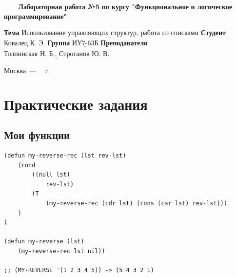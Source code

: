 \documentclass[a4paper,14pt, unknownkeysallowed]{extreport}
\begin{document}
\begin{titlepage}
	
	\begin{center}
		\noindent\begin{minipage}{1.3\textwidth}\centering
		\Large\textbf{   ~~~ Лабораторная работа №5}\newline
		\textbf{по курсу "Функциональное}\newline
		\textbf{и логическое программирование"}\newline\newline\newline
		\end{minipage}
	\end{center}
	
	\noindent\textbf{Тема} 			$\underline{\text{Использование управляющих структур, работа со списками}}$\newline\newline
	\noindent\textbf{Студент} 		$\underline{\text{Ковалец К. Э.}}$\newline\newline
	\noindent\textbf{Группа} 		$\underline{\text{ИУ7-63Б}}$\newline\newline
	\noindent\textbf{Преподаватели} $\underline{\text{Толпинская Н. Б., Строганов Ю. В.}}$\newline
	
	\begin{center}
		\vfill
		Москва~---~\the\year
		~г.
	\end{center}
	\restoregeometry
\end{titlepage}



\setcounter{page}{2}
\chapter{Практические задания}

\section{Мои функции}

\begin{center}
\captionsetup{justification=raggedright,singlelinecheck=off}
\begin{lstlisting}[label=lst:parallel_processing,caption=my-reverse]
(defun my-reverse-rec (lst rev-lst)
	(cond 
		((null lst)
			rev-lst)
		(T 
			(my-reverse-rec (cdr lst) (cons (car lst) rev-lst)))
	)
)

(defun my-reverse (lst)
	(my-reverse-rec lst nil))

;; (MY-REVERSE '(1 2 3 4 5)) -> (5 4 3 2 1)
\end{lstlisting}
\end{center}
\end{document}
